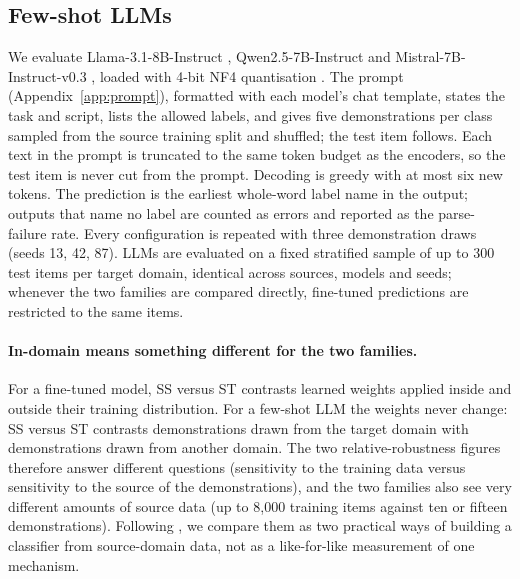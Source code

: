 \documentclass[acmsmall,screen]{acmart}
\begin{document}
\subsection{Few-shot LLMs}\label{sec:llm}
We evaluate Llama-3.1-8B-Instruct \citep{grattafiori2024llama3}, Qwen2.5-7B-Instruct \citep{qwen2024qwen25} and Mistral-7B-Instruct-v0.3 \citep{jiang2023mistral}, loaded with 4-bit NF4 quantisation \citep{dettmers2023qlora}. The prompt (Appendix~\ref{app:prompt}), formatted with each model's chat template, states the task and script, lists the allowed labels, and gives five demonstrations per class sampled from the source training split and shuffled; the test item follows. Each text in the prompt is truncated to the same token budget as the encoders, so the test item is never cut from the prompt. Decoding is greedy with at most six new tokens. The prediction is the earliest whole-word label name in the output; outputs that name no label are counted as errors and reported as the parse-failure rate. Every configuration is repeated with three demonstration draws (seeds 13, 42, 87). LLMs are evaluated on a fixed stratified sample of up to 300 test items per target domain, identical across sources, models and seeds; whenever the two families are compared directly, fine-tuned predictions are restricted to the same items.

\paragraph{In-domain means something different for the two families.} For a fine-tuned model, SS versus ST contrasts learned weights applied inside and outside their training distribution. For a few-shot LLM the weights never change: SS versus ST contrasts demonstrations drawn from the target domain with demonstrations drawn from another domain. The two relative-robustness figures therefore answer different questions (sensitivity to the training data versus sensitivity to the source of the demonstrations), and the two families also see very different amounts of source data (up to 8{,}000 training items against ten or fifteen demonstrations). Following \citet{calderon2024measuring}, we compare them as two practical ways of building a classifier from source-domain data, not as a like-for-like measurement of one mechanism.
\end{document}
